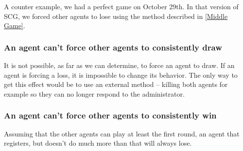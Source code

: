 \documentclass[letterpaper,12pt,oneside]{article}
\begin{document}
A counter example, we had a perfect game on October 29th. In that version
of SCG, we forced other agents to lose using the method described in
\ref{Middle Game}.

\subsubsection{An agent can't force other agents to consistently draw}

It is not possible, as far as we can determine, to force an agent to draw. If
an agent is forcing a loss, it is impossible to change its behavior. The only
way to get this effect would be to use an external method -- killing both
agents for example so they can no longer respond to the administrator.

\subsubsection{An agent can't force other agents to consistently win}

Assuming that the other agents can play at least the first round, an agent
that registers, but doesn't do much more than that will always lose.


% 
%
{}

\end{document}
